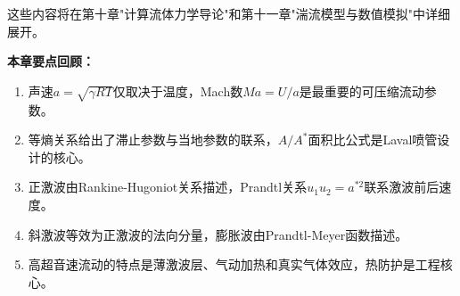 这些内容将在第十章"计算流体力学导论"和第十一章"湍流模型与数值模拟"中详细展开。

\vspace{12pt}

\noindent\textbf{本章要点回顾：}
\begin{enumerate}
  \item 声速$a = \sqrt{\gamma RT}$仅取决于温度，Mach数$Ma = U/a$是最重要的可压缩流动参数。
  \item 等熵关系给出了滞止参数与当地参数的联系，$A/A^{*}$面积比公式是Laval喷管设计的核心。
  \item 正激波由Rankine-Hugoniot关系描述，Prandtl关系$u_1 u_2 = a^{*2}$联系激波前后速度。
  \item 斜激波等效为正激波的法向分量，膨胀波由Prandtl-Meyer函数描述。
  \item 高超音速流动的特点是薄激波层、气动加热和真实气体效应，热防护是工程核心。
\end{enumerate}
